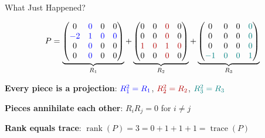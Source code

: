 \documentclass[10pt]{beamer}
\theoremstyle{definition}
\newcommand{\x}[1]{\alert{\textbf{#1}}}
\newcommand{\bl}[1]{{\color{blue}#1}}                 %
\newcommand{\rd}[1]{{\color{red!70!black}#1}}         %
\newcommand{\tl}[1]{{\color{teal}#1}}                 %
\begin{document}
\begin{frame}{What Just Happened?}

$$P = \underbrace{\begin{pmatrix} 0 & \bl{0} & 0 & 0 \\ \bl{-2} & \bl{1} & \bl{0} & \bl{0} \\ 0 & \bl{0} & 0 & 0 \\ 0 & \bl{0} & 0 & 0 \end{pmatrix}}_{R_1} + \underbrace{\begin{pmatrix} 0 & 0 & \rd{0} & 0 \\ 0 & 0 & \rd{0} & 0 \\ \rd{1} & \rd{0} & \rd{1} & \rd{0} \\ 0 & 0 & \rd{0} & 0 \end{pmatrix}}_{R_2} + \underbrace{\begin{pmatrix} 0 & 0 & 0 & \tl{0} \\ 0 & 0 & 0 & \tl{0} \\ 0 & 0 & 0 & \tl{0} \\ \tl{-1} & \tl{0} & \tl{0} & \tl{1} \end{pmatrix}}_{R_3}$$

\vspace{0.3em}

\x{Every piece is a projection}: $\bl{R_1^2 = R_1}$, \; $\rd{R_2^2 = R_2}$, \; $\tl{R_3^2 = R_3}$ \;\checkmark

\vspace{0.3em}

\x{Pieces annihilate each other}: $R_i R_j = 0$ for $i \neq j$ \;\checkmark

\vspace{0.3em}

\x{Rank equals trace}: $\operatorname{rank}(P) = 3 = 0 + 1 + 1 + 1 = \operatorname{trace}(P)$ \;\checkmark

\end{frame}
\end{document}

